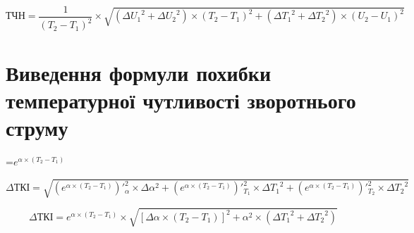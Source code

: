 \documentclass[a4paper,14pt]{article}
\begin{document}
\begin{equation}
 \text{ТЧН}=\boxed{  \frac{1}{(T_2-T_1)^2}\times{\sqrt{(\Delta{U_1}^2+\Delta{U_2}^2)\times{(T_2-T_1)^2}+(\Delta{T_1}^2+\Delta{T_2}^2)\times{(U_2-U_1)^2}}  }  }
\end{equation}

\section{Виведення формули похибки температурної чутливості зворотнього струму }
=$e^{\alpha\times{(T_2-T_1)}}$


\begin{equation}
\Delta{\text{ТКІ}}=\sqrt{(e^{\alpha\times{(T_2-T_1)}})'^2_{\alpha}\times{\Delta{\alpha}^2}+(e^{\alpha\times{(T_2-T_1)}})'^2_{T_1}\times{\Delta{T_1}^2}+(e^{\alpha\times{(T_2-T_1)}})'^2_{T_2}\times{\Delta{T_2}^2}  }
\end{equation}

\begin{equation}
\Delta{\text{ТКІ}}=e^{\alpha\times{(T_2-T_1)}}\times{\sqrt{[\Delta{\alpha}\times{(T_2-T_1)}]^2+\alpha^2\times{(\Delta{T_1}^2+\Delta{T_2}^2)}          }                    }
\end{equation}
\end{document}
